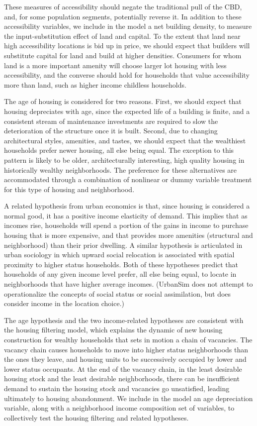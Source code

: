 These measures of accessibility should negate the traditional pull
of the CBD, and, for some population segments, potentially reverse
it.  In addition to these accessibility variables, we include in
the model a net building density, to measure the
input-substitution effect of land and capital.  To the extent that
land near high accessibility locations is bid up in price, we
should expect that builders will substitute capital for land and
build at higher densities.  Consumers for whom land is a more
important amenity will choose larger lot housing with less
accessibility, and the converse should hold for households that
value accessibility more than land, such as higher income
childless households.

The age of housing is considered for two reasons.  First, we
should expect that housing depreciates with age, since the
expected life of a building is finite, and a consistent stream of
maintenance investments are required to slow the deterioration of
the structure once it is built.  Second, due to changing
architectural styles, amenities, and tastes, we should expect that
the wealthiest households prefer newer housing, all else being
equal.  The exception to this pattern is likely to be older,
architecturally interesting, high quality housing in historically
wealthy neighborhoods.  The preference for these alternatives are
accommodated through a combination of nonlinear or dummy variable
treatment for this type of housing and neighborhood.

A related hypothesis from urban economics is that, since housing
is considered a normal good, it has a positive income elasticity
of demand.  This implies that as incomes rise, households will
spend a portion of the gains in income to purchase housing that is
more expensive, and that provides more amenities (structural and
neighborhood) than their prior dwelling.  A similar hypothesis is
articulated in urban sociology in which upward social relocation is
associated with spatial proximity to higher status households.
Both of these hypotheses predict that households of any given
income level prefer, all else being equal, to locate in
neighborhoods that have higher average incomes.  (UrbanSim does
not attempt to operationalize the concepts of social status or
social assimilation, but does consider income in the location
choice.)

The age hypothesis and the two income-related hypotheses are
consistent with the housing filtering model, which explains the
dynamic of new housing construction for wealthy households that
sets in motion a chain of vacancies.   The vacancy chain causes
households to move into higher status neighborhoods than the ones
they leave, and housing units to be successively occupied by lower
and lower status occupants.  At the end of the vacancy chain, in
the least desirable housing stock and the least desirable
neighborhoods, there can be insufficient demand to sustain the
housing stock and vacancies go unsatisfied, leading ultimately to
housing abandonment.  We include in the model an age depreciation
variable, along with a neighborhood income composition set of
variables, to collectively test the housing filtering and related
hypotheses.

